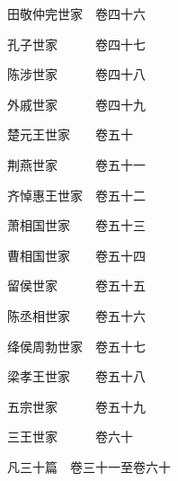\par\hspace{3.5em}田敬仲完世家　\hspace{1.5em}卷四十六
\par\hspace{3.5em}孔子世家　　　\hspace{1.5em}卷四十七
\par\hspace{3.5em}陈涉世家　　　\hspace{1.5em}卷四十八
\par\hspace{3.5em}外戚世家　　　\hspace{1.5em}卷四十九
\par\hspace{3.5em}楚元王世家　　\hspace{1.5em}卷五十
\par\hspace{3.5em}荆燕世家　　　\hspace{1.5em}卷五十一
\par\hspace{3.5em}齐悼惠王世家　\hspace{1.5em}卷五十二
\par\hspace{3.5em}萧相国世家　　\hspace{1.5em}卷五十三
\par\hspace{3.5em}曹相国世家　　\hspace{1.5em}卷五十四
\par\hspace{3.5em}留侯世家　　　\hspace{1.5em}卷五十五
\par\hspace{3.5em}陈丞相世家　　\hspace{1.5em}卷五十六
\par\hspace{3.5em}绛侯周勃世家　\hspace{1.5em}卷五十七
\par\hspace{3.5em}梁孝王世家　　\hspace{1.5em}卷五十八
\par\hspace{3.5em}五宗世家　　　\hspace{1.5em}卷五十九
\par\hspace{3.5em}三王世家　　　\hspace{1.5em}卷六十
\par\hspace{3.5em}凡三十篇　卷三十一至卷六十
